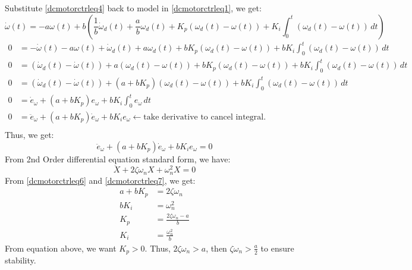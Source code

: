Substitute \autoref{dcmotorctrleq4} back to model in \autoref{dcmotorctrleq1}, we get:
\begin{equation}
	\label{dcmotorctrleq5}
	\dot{\omega}(t) = -a\omega(t) + b\left(\frac{1}{b}\dot{\omega}_d(t) + \frac{a}{b}\omega_d(t) + K_p(\omega_d(t) - \omega(t)) + K_i \int_{0}^{t} (\omega_d(t) - \omega(t)) \,dt\right)
\end{equation}
\[
\begin{split}
	0 &= -\dot{\omega}(t) - a\omega(t) + \dot{\omega}_d(t) + a\omega_d(t) + bK_p(\omega_d(t) - \omega(t)) + bK_i \int_{0}^{t} (\omega_d(t) - \omega(t)) \,dt \\
	0 &= (\dot{\omega}_d(t) - \dot{\omega}(t)) + a(\omega_d(t) - \omega(t)) + bK_p(\omega_d(t) - \omega(t)) + bK_i \int_{0}^{t} (\omega_d(t) - \omega(t)) \,dt \\
	0 &= (\dot{\omega}_d(t) - \dot{\omega}(t)) + (a + bK_p)(\omega_d(t) - \omega(t)) + bK_i \int_{0}^{t} (\omega_d(t) - \omega(t)) \,dt \\
	0 &= \dot{e}_{\omega} + (a + bK_p)e_{\omega} + bK_i \int_{0}^{t} e_{\omega}\,dt \\
	0 &= \ddot{e}_{\omega} + (a + bK_p)\dot{e}_{\omega} + bK_ie_{\omega} \leftarrow \text{take derivative to cancel integral.}\\
\end{split}
\]
Thus, we get:
\begin{equation}
	\label{dcmotorctrleq6}
	\ddot{e}_{\omega} + (a + bK_p)\dot{e}_{\omega} + bK_ie_{\omega} = 0
\end{equation}
From 2nd Order differential equation standard form, we have:
\begin{equation}
	\label{dcmotorctrleq7}
	\ddot{X} + 2\zeta\omega_nX+\omega_n^2X = 0
\end{equation}
From \autoref{dcmotorctrleq6} and \autoref{dcmotorctrleq7}, we get:
\[
\begin{split}
	a + bK_p &= 2\zeta\omega_n \\
	bK_i     &= \omega_n^2 \\
	K_p      &= \frac{2\zeta\omega_n - a}{b} \\
	K_i      &= \frac{\omega_n^2}{b}
\end{split}
\]
From equation above, we want \(K_p > 0\). Thus, \(2\zeta\omega_n > a\), then \(\zeta\omega_n > \frac{a}{2}\) to ensure stability.

